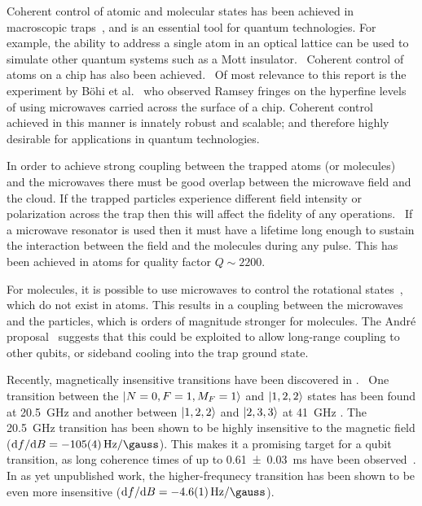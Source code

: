 %
Coherent control of atomic and molecular states has been achieved in macroscopic
traps~\cite{Gross995, Blackmore_2018}, and is an essential tool for quantum
technologies. For example, the ability to address a single atom in an optical
lattice can be used to simulate other quantum systems such as a Mott
insulator.~\cite{Weitenberg2011} Coherent control of atoms on a chip has also
been achieved.~\cite{PhysRevLett.92.063601} Of most relevance to this report is
the experiment by B\"ohi et al.~\cite{Boehi2009} who observed Ramsey fringes on
the hyperfine levels of \esRb{} using microwaves carried across the surface of a
chip. Coherent control achieved in this manner is innately robust and scalable;
and therefore highly desirable for applications in quantum technologies.

%
In order to achieve strong coupling between the trapped atoms (or molecules) and
the microwaves there must be good overlap between the microwave field and the
cloud.  If the trapped particles experience different field intensity or
polarization across the trap then this will affect the fidelity of any
operations.~\cite{Williams2018} If a microwave resonator is used then it must
have a lifetime long enough to sustain the interaction between the field and the
molecules during any pulse. This has been achieved in atoms for quality factor
$Q\sim2200$.~\cite{Hattermann2017}

%
For molecules, it is possible to use microwaves to control the rotational
states~\cite{Blackmore_2018}, which do not exist in atoms. This results in a
coupling between the microwaves and the particles, which is orders of magnitude
stronger for molecules. The Andr\'e proposal~\cite{Andre2006} suggests that this
could be exploited to allow long-range coupling to other qubits, or sideband
cooling into the trap ground state.

%
Recently, magnetically insensitive transitions have been discovered in
\CaF{}.~\cite{Williams2018, Blackmore_2018}  One transition between
the $\ket{N=0, F=1, M_F=1}$ and $\ket{1,2,2}$ states has been found at
\SI{20.5}{\giga\hertz} and another between $\ket{1,2,2}$ and $\ket{2,3,3}$ at
\SI{41}{\giga\hertz} . The \SI{20.5}{\giga\hertz} transition has been shown to
be highly insensitive to the magnetic field ($\dd f / \dd B =
-\SI{105(4)}{\hertz\per\gauss}$). This makes it a promising target for a qubit
transition, as long coherence times of up to \SI{0.61(3)}{\milli\second} have
been observed~\cite{Blackmore_2018}. In as yet unpublished work, the
higher-frequnecy transition has been shown to be even more insensitive ($\dd f /
\dd B = -\SI{4.6(1)}{\hertz\per\gauss}$). 

